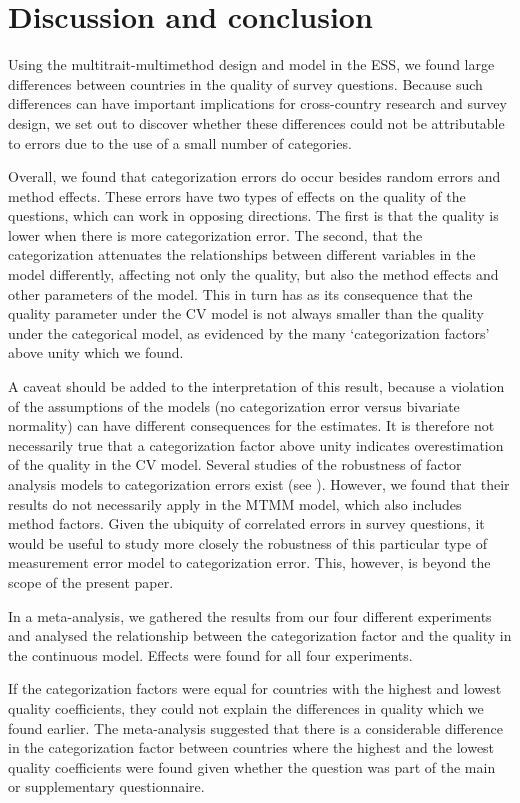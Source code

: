 \documentclass[a4paper,12pt]{article}
\begin{document}
\section{Discussion and conclusion}

Using the multitrait-multimethod design and model in the ESS, we found large differences between countries in the quality of survey questions. Because such differences can have important implications for cross-country research and survey design, we set out to discover whether these differences could not be attributable to errors due to the use of a small number of categories. 

Overall, we found that categorization errors do occur besides random errors and method effects. These errors have two types of effects on the quality of the questions, which can work in opposing directions. The first is that the quality is lower when there is more categorization error. The second, that the categorization attenuates the relationships between different variables in the model differently, affecting not only the quality, but also the method effects and other parameters of the model. This in turn has as its consequence that the quality parameter under the CV model is not always smaller than the quality under the categorical model, as evidenced by the many `categorization factors' above unity which we found. 

A caveat should be added to the interpretation of this result, because a violation of the assumptions of the models (no categorization error versus bivariate normality) can have different consequences for the estimates. It is therefore not necessarily true that a categorization factor above unity indicates overestimation of the quality in the CV model. Several studies of the robustness of factor analysis models to categorization errors exist (see \citealt{olsson_robustness_1979}). However, we found that their results do not necessarily apply in the MTMM model, which also includes method factors. Given the ubiquity of correlated errors in survey questions, it would be useful to study more closely the robustness of this particular type of measurement error model to categorization error. This, however, is beyond the scope of the present paper.

In a meta-analysis, we gathered the results from our four different experiments and analysed the relationship between the categorization factor and the quality in the continuous model. Effects were found for all four experiments.

If the categorization factors were equal for countries with the highest and lowest quality coefficients, they could not explain the differences in quality which we found earlier. The meta-analysis suggested that there is a considerable difference in the categorization factor between countries where the highest and the lowest quality coefficients were found given whether the question was part of the main or supplementary questionnaire.
\end{document}
